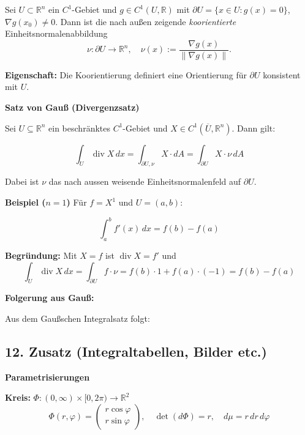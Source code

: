 
Sei $U \subset \mathbb{R}^n$ ein $C^1$-Gebiet und $g \in C^1(U, \mathbb{R})$ mit $\partial U = \{x \in U : g(x) = 0\}$, $\nabla g(x_0) \neq 0$.  
Dann ist die nach außen zeigende \textit{koorientierte} Einheitsnormalenabbildung
\[
\nu: \partial U \to \mathbb{R}^n, \quad \nu(x) := \frac{\nabla g(x)}{\|\nabla g(x)\|}.
\]

\textbf{Eigenschaft:}  
Die Koorientierung definiert eine Orientierung für $\partial U$ konsistent mit $U$.

\textbf{Satz von Gauß (Divergenzsatz)}

Sei $U \subseteq \mathbb{R}^n$ ein beschränktes $C^1$-Gebiet und $X \in C^1(\overline{U}, \mathbb{R}^n)$. Dann gilt:

\[
\int_U \operatorname{div} X \, dx = \int_{\partial U, \nu} X \cdot dA = \int_{\partial U} X \cdot \nu \, dA
\]

Dabei ist $\nu$ das nach aussen weisende Einheitsnormalenfeld auf $\partial U$.

\textbf{Beispiel ($n=1$)}
Für $f = X^1$ und $U = (a,b)$:

\[
\int_a^b f'(x)\, dx = f(b) - f(a)
\]

\textbf{Begründung:} Mit $X = f$ ist $\operatorname{div} X = f'$ und
\[
\int_U \operatorname{div} X \, dx = \int_{\partial U} f \cdot \nu = f(b)\cdot 1 + f(a)\cdot (-1) = f(b) - f(a)
\]

\textbf{Folgerung aus Gauß:}

Aus dem Gaußschen Integralsatz folgt:


\subsection{12. Zusatz (Integraltabellen, Bilder etc.)}


\textbf{Parametrisierungen}

\vspace{0.5em}

\textbf{Kreis:} $\Phi : (0, \infty) \times [0, 2\pi) \to \mathbb{R}^2$
\[
\Phi(r, \varphi) = \begin{pmatrix} r\cos\varphi \\ r\sin\varphi \end{pmatrix}, \quad
\det(d\Phi) = r, \quad
d\mu = r\,dr\,d\varphi
\]

